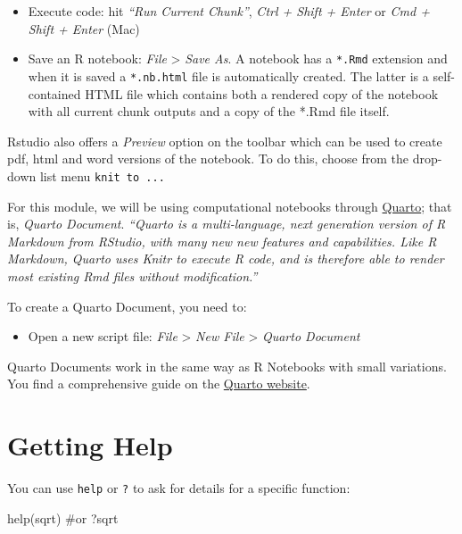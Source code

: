 \documentclass[
  letterpaper,
  krantz2]{style/krantz}
\newenvironment{Shaded}{\begin{snugshade}}{\end{snugshade}}
\newcommand{\CommentTok}[1]{\textcolor[rgb]{0.37,0.37,0.37}{#1}}
\newcommand{\FunctionTok}[1]{\textcolor[rgb]{0.28,0.35,0.67}{#1}}
\newcommand{\NormalTok}[1]{\textcolor[rgb]{0.00,0.23,0.31}{#1}}
\providecommand{\tightlist}{%
  \setlength{\itemsep}{0pt}\setlength{\parskip}{0pt}}\usepackage{longtable,booktabs,array}
\begin{document}
\begin{itemize}
\item
  Execute code: hit \emph{``Run Current Chunk''}, \emph{Ctrl + Shift +
  Enter} or \emph{Cmd + Shift + Enter} (Mac)
\item
  Save an R notebook: \emph{File} \textgreater{} \emph{Save As}. A
  notebook has a \texttt{*.Rmd} extension and when it is saved a
  \texttt{*.nb.html} file is automatically created. The latter is a
  self-contained HTML file which contains both a rendered copy of the
  notebook with all current chunk outputs and a copy of the *.Rmd file
  itself.
\end{itemize}

Rstudio also offers a \emph{Preview} option on the toolbar which can be
used to create pdf, html and word versions of the notebook. To do this,
choose from the drop-down list menu \texttt{knit\ to\ ...}

For this module, we will be using computational notebooks through
\href{https://quarto.org}{Quarto}; that is, \emph{Quarto Document}.
\emph{``Quarto is a multi-language, next generation version of R
Markdown from RStudio, with many new new features and capabilities. Like
R Markdown, Quarto uses Knitr to execute R code, and is therefore able
to render most existing Rmd files without modification.''}

To create a Quarto Document, you need to:

\begin{itemize}
\tightlist
\item
  Open a new script file: \emph{File} \textgreater{} \emph{New File}
  \textgreater{} \emph{Quarto Document}
\end{itemize}

Quarto Documents work in the same way as R Notebooks with small
variations. You find a comprehensive guide on the
\href{https://quarto.org/docs/guide/}{Quarto website}.

\hypertarget{getting-help}{%
\section{Getting Help}\label{getting-help}}

You can use \texttt{help} or \texttt{?} to ask for details for a
specific function:

\begin{Shaded}
\begin{Highlighting}[]
\FunctionTok{help}\NormalTok{(sqrt) }\CommentTok{\#or ?sqrt}
\end{Highlighting}
\end{Shaded}
\end{document}

